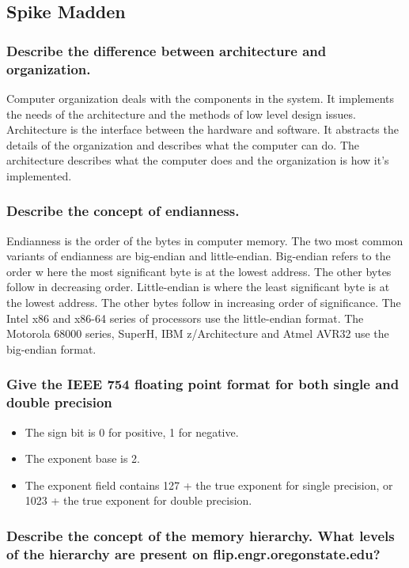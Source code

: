 \documentclass[letterpaper,10pt,titlepage]{article}
\begin{document}
\subsection*{Spike Madden}

\subsubsection*{Describe the difference between architecture and organization.}
Computer organization deals with the components in the system. It implements the needs of the architecture and the methods of low level design issues. Architecture is the interface between the hardware and software. It abstracts the details of the organization and describes what the computer can do. The architecture describes what the computer does and the organization is how it's implemented.

\subsubsection*{Describe the concept of endianness.}
Endianness is the order of the bytes in computer memory. The two most common variants of endianness are big-endian and little-endian. Big-endian refers to the order w here the most significant byte is at the lowest address. The other bytes follow in decreasing order. Little-endian is where the least significant byte is at the lowest address. The other bytes follow in increasing order of significance. The Intel x86 and x86-64 series of processors use the little-endian format.
The Motorola 68000 series, SuperH, IBM z/Architecture and Atmel AVR32 use the big-endian format.

\subsubsection*{Give the IEEE 754 floating point format for both single and double precision}

\begin{itemize}
  \item The sign bit is 0 for positive, 1 for negative.
  \item The exponent base is 2.
  \item The exponent field contains 127 + the true exponent for single precision, or 1023 + the true exponent for double precision.
\end{itemize}

\subsubsection*{Describe the concept of the memory hierarchy. What levels of the hierarchy are present on flip.engr.oregonstate.edu?}
\end{document}
